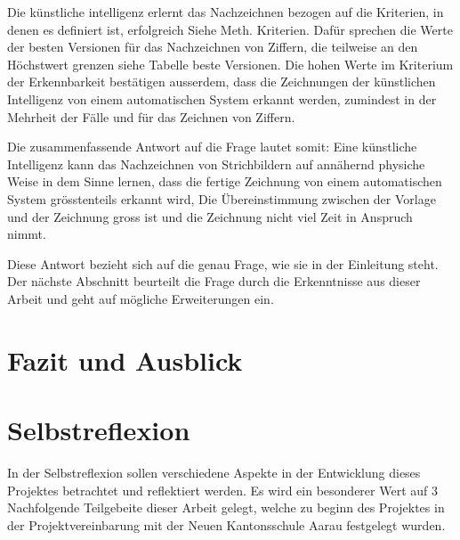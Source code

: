 Die künstliche intelligenz erlernt das Nachzeichnen bezogen auf die Kriterien,
in denen es definiert ist, erfolgreich {Siehe Meth. Kriterien}. Dafür sprechen
die Werte der besten Versionen für das Nachzeichnen von Ziffern, die teilweise
an den Höchstwert grenzen {siehe Tabelle beste Versionen}. Die hohen Werte im
Kriterium der Erkennbarkeit bestätigen ausserdem, dass die Zeichnungen der
künstlichen Intelligenz von einem automatischen System erkannt werden, zumindest
in der Mehrheit der Fälle und für das Zeichnen von Ziffern.


Die zusammenfassende Antwort auf die Frage lautet somit: Eine künstliche
Intelligenz kann das Nachzeichnen von Strichbildern auf annähernd physiche Weise
in dem Sinne lernen, dass die fertige Zeichnung von einem automatischen System
grösstenteils erkannt wird, Die Übereinstimmung zwischen der Vorlage und der
Zeichnung gross ist und die Zeichnung nicht viel Zeit in Anspruch nimmt.

Diese Antwort bezieht sich auf die genau Frage, wie sie in der Einleitung steht.
Der nächste Abschnitt beurteilt die Frage durch die Erkenntnisse aus dieser
Arbeit und geht auf mögliche Erweiterungen ein.



\section{Fazit und Ausblick}








\section{Selbstreflexion}
In der Selbstreflexion sollen verschiedene Aspekte in der Entwicklung dieses
Projektes betrachtet und reflektiert werden. Es wird ein besonderer Wert auf 3
Nachfolgende Teilgebeite dieser Arbeit gelegt, welche zu beginn des Projektes in
der Projektvereinbarung mit der Neuen Kantonsschule Aarau festgelegt wurden.

